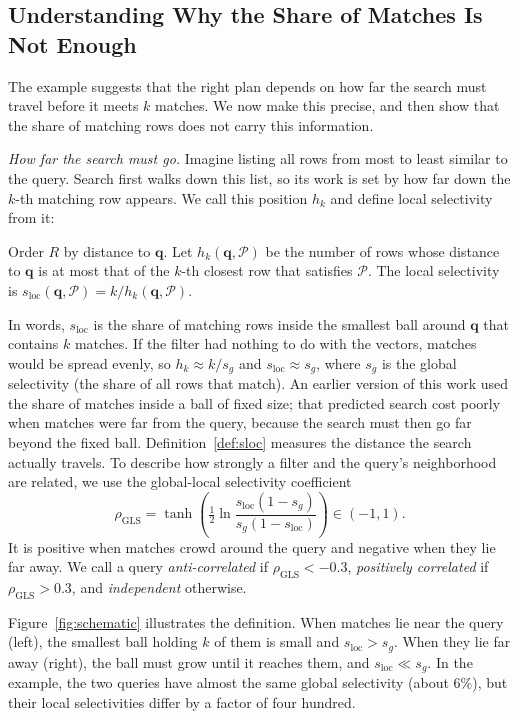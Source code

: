 \documentclass[sigconf, nonacm]{acmart}
\newcommand{\sg}{s_g}
\newcommand{\sloc}{s_{\text{loc}}}
\begin{document}
\subsection{Understanding Why the Share of Matches Is Not Enough}\label{sec:understanding}\label{sec:formulation}
The example suggests that the right plan depends on how far the search must travel before it meets $k$ matches. We now make this precise, and then show that the share of matching rows does not carry this information.

\emph{How far the search must go.} Imagine listing all rows from most to least similar to the query. Search first walks down this list, so its work is set by how far down the $k$-th matching row appears. We call this position $h_k$ and define local selectivity from it:
\begin{definition}\label{def:sloc}
Order $R$ by distance to $\mathbf{q}$. Let $h_k(\mathbf{q},\mathcal{P})$ be the number of rows whose distance to $\mathbf{q}$ is at most that of the $k$-th closest row that satisfies $\mathcal{P}$. The local selectivity is $\sloc(\mathbf{q},\mathcal{P}) = k/h_k(\mathbf{q},\mathcal{P})$.
\end{definition}
In words, $\sloc$ is the share of matching rows inside the smallest ball around $\mathbf{q}$ that contains $k$ matches. If the filter had nothing to do with the vectors, matches would be spread evenly, so $h_k \approx k/\sg$ and $\sloc\approx\sg$, where $\sg$ is the global selectivity (the share of all rows that match). An earlier version of this work used the share of matches inside a ball of fixed size; that predicted search cost poorly when matches were far from the query, because the search must then go far beyond the fixed ball. Definition~\ref{def:sloc} measures the distance the search actually travels. To describe how strongly a filter and the query's neighborhood are related, we use the global-local selectivity coefficient~\cite{amanbayev2026fanns}
\begin{equation}\label{eq:gls}
\rho_{\text{GLS}} = \tanh\!\left(\tfrac{1}{2}\ln\frac{\sloc(1-\sg)}{\sg(1-\sloc)}\right)\in(-1,1).
\end{equation}
It is positive when matches crowd around the query and negative when they lie far away. We call a query \emph{anti-correlated} if $\rho_{\text{GLS}}<-0.3$, \emph{positively correlated} if $\rho_{\text{GLS}}>0.3$, and \emph{independent} otherwise.

Figure~\ref{fig:schematic} illustrates the definition. When matches lie near the query (left), the smallest ball holding $k$ of them is small and $\sloc>\sg$. When they lie far away (right), the ball must grow until it reaches them, and $\sloc\ll\sg$. In the example, the two queries have almost the same global selectivity (about $6\%$), but their local selectivities differ by a factor of four hundred.
\end{document}
